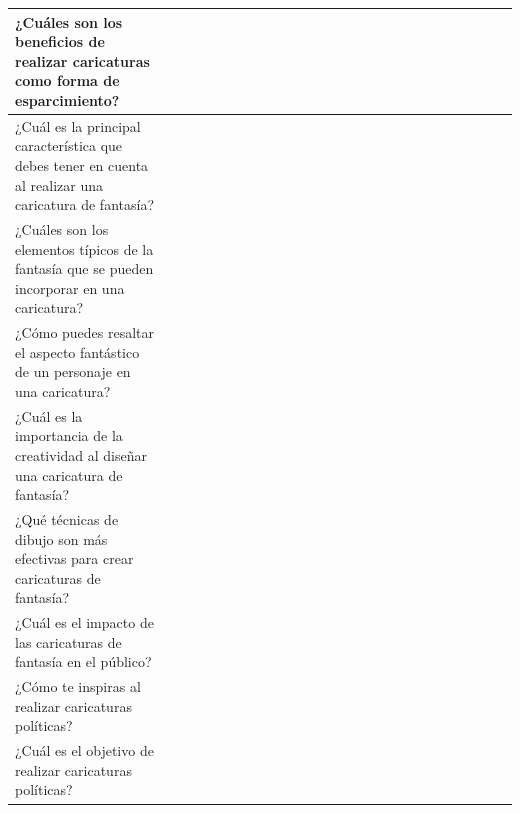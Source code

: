 \documentclass[12pt,a4paper]{article}
\begin{document}
\begin{landscape}
\begin{table}[ht!]
\begin{tabular}{|l|l|l|l|l|l|l|l|l|l|l|l|l|l|l|l|l|l|l|l|l|l|l|l|l|l|}
			¿Cuáles son los beneficios de realizar caricaturas como forma de esparcimiento?                        &                                          &    &    &    &    &    &    &    &    &     &     &     &     &     &     &     &     &     &     &     &           \\\hline
			¿Cuál es la principal característica que debes tener en cuenta al realizar una caricatura de fantasía? &                                          &    &    &    &    &    &    &    &    &     &     &     &     &     &     &     &     &     &     &     &           \\\hline
			¿Cuáles son los elementos típicos de la fantasía que se pueden incorporar en una caricatura?           &                                          &    &    &    &    &    &    &    &    &     &     &     &     &     &     &     &     &     &     &     &           \\\hline
			¿Cómo puedes resaltar el aspecto fantástico de un personaje en una caricatura?                         &                                          &    &    &    &    &    &    &    &    &     &     &     &     &     &     &     &     &     &     &     &           \\\hline
			¿Cuál es la importancia de la creatividad al diseñar una caricatura de fantasía?                       &                                          &    &    &    &    &    &    &    &    &     &     &     &     &     &     &     &     &     &     &     &           \\\hline
			¿Qué técnicas de dibujo son más efectivas para crear caricaturas de fantasía?                          &                                          &    &    &    &    &    &    &    &    &     &     &     &     &     &     &     &     &     &     &     &           \\\hline
			¿Cuál es el impacto de las caricaturas de fantasía en el público?                                      &                                          &    &    &    &    &    &    &    &    &     &     &     &     &     &     &     &     &     &     &     &           \\\hline
			¿Cómo te inspiras al realizar caricaturas políticas?                                                   &                                          &    &    &    &    &    &    &    &    &     &     &     &     &     &     &     &     &     &     &     &           \\\hline
			¿Cuál es el objetivo de realizar caricaturas políticas?                                                &                                          &    &    &    &    &    &    &    &    &     &     &     &     &     &     &     &     &     &     &     &           \\\hline

\end{tabular}
\end{table}
\end{landscape}
\end{document}
